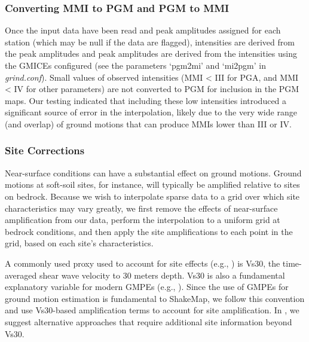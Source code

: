 \documentclass[letterpaper,10pt,english]{sphinxmanual}
\begin{document}
\subsubsection{Converting MMI to PGM and PGM to MMI}
\label{tg_processing:converting-mmi-to-pgm-and-pgm-to-mmi}
Once the input data have been read and peak amplitudes assigned for each station (which
may be null if the data are flagged), intensities are derived from the peak
amplitudes and peak amplitudes are derived from the intensities using the GMICEs
configured (see the parameters `pgm2mi' and `mi2pgm' in \emph{grind.conf}). Small values of
observed intensities (MMI \textless{} III for PGA, and MMI \textless{} IV for other parameters) are not
converted to PGM for inclusion in the PGM maps. Our testing indicated that including
these low intensities introduced a significant source of error in the interpolation, likely
due to the very wide range (and overlap) of ground motions that can produce MMIs lower than III or IV.


\subsubsection{Site Corrections}
\label{tg_processing:site-corrections}
Near-surface conditions can have a substantial effect on ground motions. Ground motions
at soft-soil sites, for instance, will typically be amplified relative to sites on bedrock.
Because we wish to interpolate sparse data to a grid over which site characteristics may
vary greatly, we first remove the effects of near-surface amplification from our data,
perform the interpolation to a uniform grid at bedrock conditions, and then apply the site
amplifications to each point in the grid, based on each site's characteristics.

A commonly used proxy used to account for site effects (e.g., {\hyperref[references:borcherdt1994]{}}) is Vs30,
the time-averaged shear wave velocity to 30 meters depth. Vs30 is also a fundamental
explanatory variable for modern GMPEs (e.g., {\hyperref[references:abrahamson2014]{}}).  Since the use
of GMPEs for ground motion estimation is fundamental to ShakeMap, we follow this
convention and use Vs30-based amplification terms to account for site amplification.
In {\hyperref[future_directions:future\string-directions]{}}, we suggest alternative approaches that require additional
site information beyond Vs30.
\end{document}
